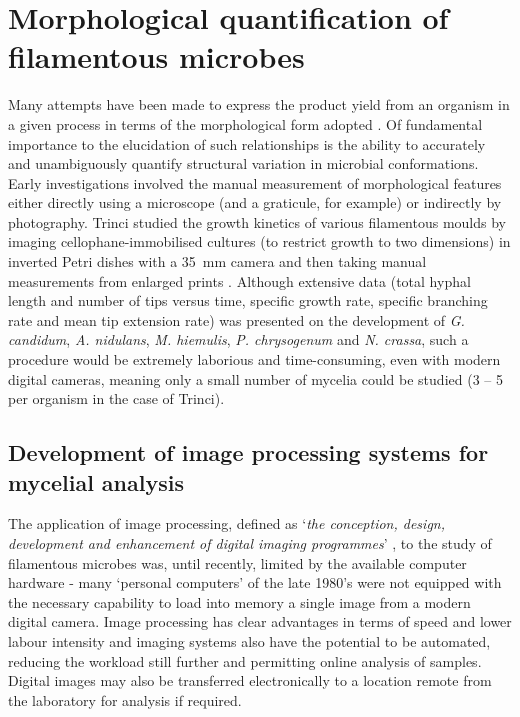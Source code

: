 \section{Morphological quantification of filamentous microbes}

Many attempts have been made to express the product yield from an organism in a given process in terms of the morphological form adopted \cite{papagiannireview}. Of fundamental importance to the elucidation of such relationships is the ability to accurately and unambiguously quantify structural variation in microbial conformations. Early investigations involved the manual measurement of morphological features either directly using a microscope (and a graticule, for example) or indirectly by photography. Trinci studied the growth kinetics of various filamentous moulds by imaging cellophane-immobilised cultures (to restrict growth to two dimensions) in inverted Petri dishes with a 35~mm camera and then taking manual measurements from enlarged prints \cite{trinci1974}. Although extensive data (total hyphal length and number of tips versus time, specific growth rate, specific branching rate and mean tip extension rate) was presented on the development of \emph{G. candidum}, \emph{A. nidulans}, \emph{M. hiemulis}, \emph{P. chrysogenum} and \emph{N. crassa}, such a procedure would be extremely laborious and time-consuming, even with modern digital cameras, meaning only a small number of mycelia could be studied (3 -- 5 per organism in the case of Trinci).

\subsection{Development of image processing systems for mycelial analysis}

The application of image processing, defined as \lq \emph{the conception, design, development and enhancement of digital imaging programmes}' \cite{burger2008}, to the study of filamentous microbes was, until recently, limited by the available computer hardware - many \lq personal computers' of the late 1980's were not equipped with the necessary capability to load into memory a single image from a modern digital camera. Image processing has clear advantages in terms of speed and lower labour intensity and imaging systems also have the potential to be automated, reducing the workload still further and permitting online analysis of samples. Digital images may also be transferred electronically to a location remote from the laboratory for analysis if required.

